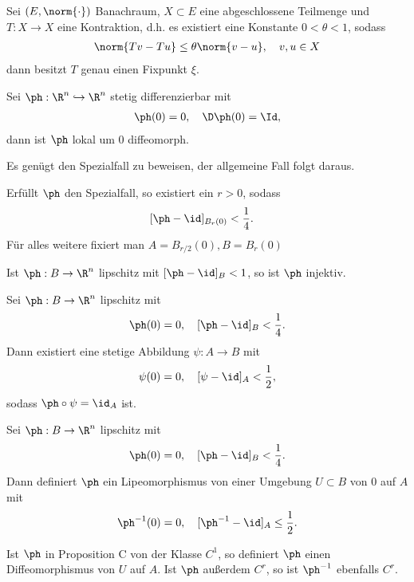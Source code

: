 \begin{prop}
Sei $(E,\norm{\cdot})$ Banachraum, $X\subset E$ eine abgeschlossene Teilmenge
und $T: X\to X$ eine Kontraktion, d.h. es existiert eine Konstante
$0<\theta<1$, sodass
\begin{align*}
\norm{Tv-Tu}\le\theta\norm{v-u},\quad v,u\in X
\end{align*}
dann besitzt $T$ genau einen Fixpunkt $\xi$.
\end{prop}
\begin{prop}[Spezialfall]
Sei $\ph: \R^n\hookrightarrow\R^n$ stetig differenzierbar mit
\begin{align*}
\ph(0) = 0, \quad \D\ph(0) = \Id,
\end{align*}
dann ist $\ph$ lokal um $0$ diffeomorph.
\end{prop}
\begin{prop}
Es genügt den Spezialfall zu beweisen, der allgemeine Fall folgt daraus. 
\end{prop}
\begin{prop}
Erfüllt $\ph$ den Spezialfall, so existiert ein $r > 0$, sodass
\begin{align*}
&[\ph-\id]_{B_r(0)} < \frac{1}{4}.
\end{align*}
Für alles weitere fixiert man $A = B_{r/2}(0), B = B_r(0)$
\end{prop}
\begin{prop}[Proposition A]
Ist $\ph: B\to \R^n$ lipschitz mit $[\ph-\id]_B < 1$, so ist $\ph$ injektiv.
\end{prop}
\begin{prop}[Proposition B]
Sei $\ph: B\to\R^n$ lipschitz mit
\begin{align*}
\ph(0) = 0,\quad [\ph-\id]_B < \frac{1}{4}.
\end{align*}
Dann existiert eine stetige Abbildung $\psi: A\to B$ mit
\begin{align*}
\psi(0) = 0,\quad [\psi-\id]_A < \frac{1}{2},
\end{align*}
sodass $\ph\circ\psi = \id_A$ ist.
\end{prop}
\begin{prop}[Proposition C]
Sei $\ph: B\to\R^n$ lipschitz mit
\begin{align*}
\ph(0) = 0,\quad [\ph-\id]_B < \frac{1}{4}.
\end{align*}
Dann definiert $\ph$ ein Lipeomorphismus von einer Umgebung $U\subset B$ von $0$
auf $A$ mit
\begin{align*}
\ph^{-1}(0) = 0,\quad [\ph^{-1}-\id]_A\le \frac{1}{2}.
\end{align*}
\end{prop}
\begin{prop}[Proposition D]
Ist $\ph$ in Proposition C von der Klasse $C^1$, so definiert $\ph$ einen
Diffeomorphismus von $U$ auf $A$. Ist $\ph$ außerdem $C^r$, so ist $\ph^{-1}$ ebenfalls $C^r$.
\end{prop}

